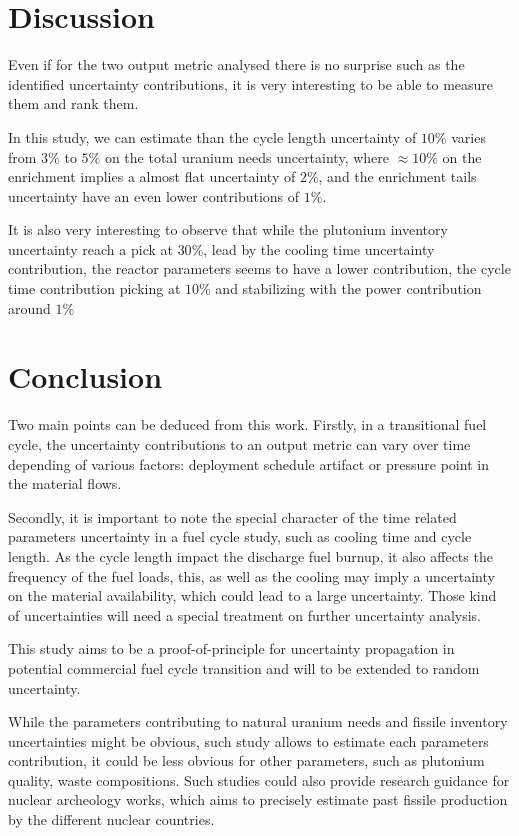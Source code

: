 \documentclass{anstrans}
\begin{document}
\section{Discussion}

Even if for the two output metric analysed there is no surprise such as the
identified uncertainty contributions, it is very interesting to be able to
measure them and rank them.

In this study, we can estimate than the cycle length uncertainty of $10\%$
varies from $3\%$ to $5\%$ on the total uranium needs uncertainty, where $\approx10\%$
on the enrichment implies a almost flat uncertainty of $2\%$, and the enrichment
tails uncertainty have an even lower contributions of $1\%$.

It is also very interesting to observe that while the plutonium inventory uncertainty
reach a pick at $30\%$, lead by the cooling time uncertainty contribution, the reactor
parameters seems to have a lower contribution, the cycle time contribution
picking at $10\%$ and stabilizing with the power contribution around $1\%$


\section{Conclusion}

Two main points can be deduced from this work. Firstly, in a transitional
fuel cycle, the uncertainty contributions to an output metric can vary over time
depending of various factors: deployment schedule artifact or pressure point in
the material flows.

Secondly, it is important to note the special character of the time related
parameters uncertainty in a fuel cycle study, such as cooling time and cycle
length. As the cycle length impact the discharge fuel burnup, it also affects
the frequency of the fuel loads, this, as well as the cooling may imply a
uncertainty on the material availability, which could lead to a large
uncertainty. Those kind of uncertainties will need a special treatment on further
uncertainty analysis.

This study aims to be a proof-of-principle for uncertainty propagation in
potential commercial fuel cycle transition and will to be extended to random
uncertainty. 

While the parameters contributing to natural uranium needs and fissile inventory
uncertainties might be obvious, such study allows to estimate each parameters
contribution, it could be less obvious for other parameters, such as
plutonium quality, waste compositions. Such studies could also provide research
guidance for nuclear archeology works, which aims to precisely estimate past
fissile production by the different nuclear countries.
\end{document}
